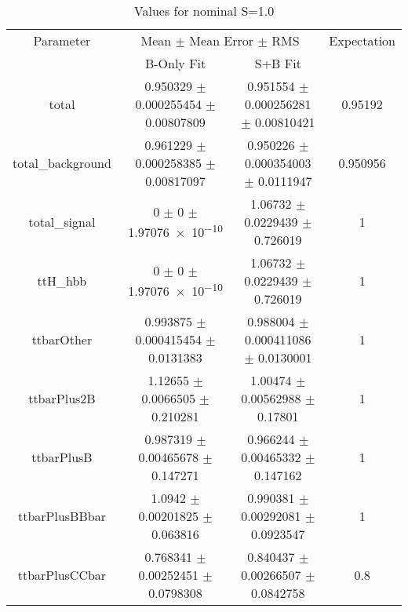 \begin{table}
\centering
\caption{Values for nominal S=1.0}
\begin{tabular}{cccc}
\toprule
Parameter & \multicolumn{2}{c}{Mean $\pm$ Mean Error $\pm$ RMS} & Expectation\\
 & B-Only Fit & S+B Fit & \\
\midrule
total & \num{0.950329} $\pm$ \num{0.000255454} $\pm$ \num{0.00807809} & \num{0.951554} $\pm$ \num{0.000256281} $\pm$ \num{0.00810421} & \num{0.95192}\\
total\_background & \num{0.961229} $\pm$ \num{0.000258385} $\pm$ \num{0.00817097} & \num{0.950226} $\pm$ \num{0.000354003} $\pm$ \num{0.0111947} & \num{0.950956}\\
total\_signal & \num{0} $\pm$ \num{0} $\pm$ \num{1.97076e-10} & \num{1.06732} $\pm$ \num{0.0229439} $\pm$ \num{0.726019} & \num{1}\\
ttH\_hbb & \num{0} $\pm$ \num{0} $\pm$ \num{1.97076e-10} & \num{1.06732} $\pm$ \num{0.0229439} $\pm$ \num{0.726019} & \num{1}\\
ttbarOther & \num{0.993875} $\pm$ \num{0.000415454} $\pm$ \num{0.0131383} & \num{0.988004} $\pm$ \num{0.000411086} $\pm$ \num{0.0130001} & \num{1}\\
ttbarPlus2B & \num{1.12655} $\pm$ \num{0.0066505} $\pm$ \num{0.210281} & \num{1.00474} $\pm$ \num{0.00562988} $\pm$ \num{0.17801} & \num{1}\\
ttbarPlusB & \num{0.987319} $\pm$ \num{0.00465678} $\pm$ \num{0.147271} & \num{0.966244} $\pm$ \num{0.00465332} $\pm$ \num{0.147162} & \num{1}\\
ttbarPlusBBbar & \num{1.0942} $\pm$ \num{0.00201825} $\pm$ \num{0.063816} & \num{0.990381} $\pm$ \num{0.00292081} $\pm$ \num{0.0923547} & \num{1}\\
ttbarPlusCCbar & \num{0.768341} $\pm$ \num{0.00252451} $\pm$ \num{0.0798308} & \num{0.840437} $\pm$ \num{0.00266507} $\pm$ \num{0.0842758} & \num{0.8}\\
\bottomrule
\end{tabular}
\end{table}